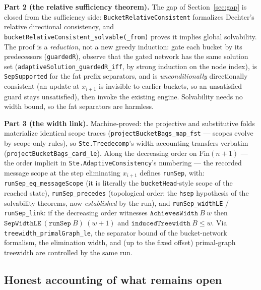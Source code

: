\documentclass[11pt]{article}
\newcommand{\ste}[1]{\texttt{#1}}
\begin{document}
\textbf{Part 2 (the relative sufficiency theorem).} The gap of
Section~\ref{sec:gap} is closed from the sufficiency side:
\ste{BucketRelativeConsistent} formalizes Dechter's relative
directional consistency, and
\ste{bucketRelativeConsistent\_solvable(\_from)} proves it implies
global solvability. The proof is a \emph{reduction}, not a new greedy
induction: gate each bucket by its predecessors (\ste{guardedR}),
observe that the gated network has the same solution set
(\ste{adaptiveSolution\_guardedR\_iff}, by strong induction on the
node index), is \ste{SepSupported} for the fat prefix separators, and
is \emph{unconditionally} directionally consistent (an update at
$x_{i+1}$ is invisible to earlier buckets, so an unsatisfied guard
stays unsatisfied), then invoke the existing engine. Solvability needs
no width bound, so the fat separators are harmless.

\textbf{Part 3 (the width link).} Machine-proved: the projective and
substitutive folds materialize identical scope traces
(\ste{projectBucketBags\_map\_fst} --- scopes evolve by scope-only
rules), so \ste{Ste.Treedecomp}'s width accounting transfers verbatim
(\ste{projectBucketBags\_card\_le}). Along the decreasing order on
$\mathrm{Fin}(n{+}1)$ --- the order implicit in
\ste{Ste.AdaptiveConsistency}'s numbering --- the recorded message
scope at the step eliminating $x_{i+1}$ defines \ste{runSep}, with:
\ste{runSep\_eq\_messageScope} (it is literally the
\ste{bucketHead}-style scope of the reached state),
\ste{runSep\_precedes} (topological order: the \ste{hsep} hypothesis
of the solvability theorems, now \emph{established} by the run), and
\ste{runSep\_widthLE} / \ste{runSep\_link}: if the decreasing order
witnesses $\ste{AchievesWidth}\ B\ w$ then
$\ste{SepWidthLE}\ (\ste{runSep}\ B)\ (w{+}1)$ and
$\ste{inducedTreewidth}\ B \le w$. Via
\ste{treewidth\_primalGraph\_le}, the separator bound of the
bucket-network formalism, the elimination width, and (up to the fixed
offset) primal-graph treewidth are controlled by the same run.

\subsection{Honest accounting of what remains open}
\label{sec:open}
\end{document}
